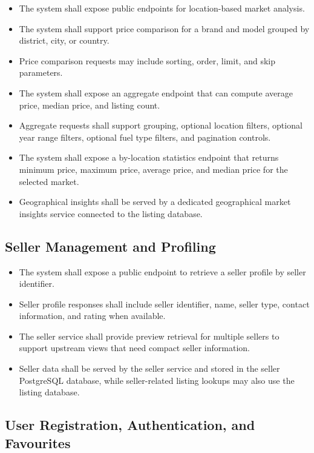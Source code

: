 \begin{itemize}
    \item The system shall expose public endpoints for location-based market analysis.
    \item The system shall support price comparison for a brand and model grouped by district, city, or country.
    \item Price comparison requests may include sorting, order, limit, and skip parameters.
    \item The system shall expose an aggregate endpoint that can compute average price, median price, and listing count.
    \item Aggregate requests shall support grouping, optional location filters, optional year range filters, optional fuel type filters, and pagination controls.
    \item The system shall expose a by-location statistics endpoint that returns minimum price, maximum price, average price, and median price for the selected market.
    \item Geographical insights shall be served by a dedicated geographical market insights service connected to the listing database.
\end{itemize}

\subsection{Seller Management and Profiling}

\begin{itemize}
    \item The system shall expose a public endpoint to retrieve a seller profile by seller identifier.
    \item Seller profile responses shall include seller identifier, name, seller type, contact information, and rating when available.
    \item The seller service shall provide preview retrieval for multiple sellers to support upstream views that need compact seller information.
    \item Seller data shall be served by the seller service and stored in the seller PostgreSQL database, while seller-related listing lookups may also use the listing database.
\end{itemize}

\subsection{User Registration, Authentication, and Favourites}

